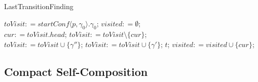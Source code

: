 \documentclass{llncs}
\begin{document}
\begin{algorithm}
\caption{\label{algo:last_trans}LastTransitionFinding}
$toVisit\mathrel{\mathop:}=startConf\langle p,\gamma_0\rangle.\gamma_0$; $visited\mathrel{\mathop:}=\emptyset$;\\
 {
    $cur\mathrel{\mathop:}=toVisit.head$; $toVisit\mathrel{\mathop:}=toVisit\setminus\{cur\}$;\\
     {
         {$toVisit\mathrel{\mathop:}=toVisit\cup\{\gamma''\}$;}
         {$toVisit\mathrel{\mathop:}=toVisit\cup\{\gamma'\}$;}
         {\Return $t$;}
    }
    $visited\mathrel{\mathop:}=visited\cup\{cur\}$;
}
\end{algorithm}

\subsection{\label{subsec:csc}Compact Self-Composition}
\end{document}
